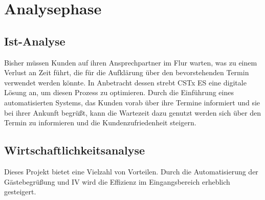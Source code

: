 \section{Analysephase} 
\label{sec:Analysephase}


\subsection{Ist-Analyse} 
\label{sec:IstAnalyse}
Bisher müssen Kunden auf ihren Ansprechpartner im Flur warten, was zu einem Verlust an Zeit führt, die für die Aufklärung über den bevorstehenden Termin verwendet werden könnte.
In Anbetracht dessen strebt \ac{CSTx ES} eine digitale Lösung an, um diesen Prozess zu optimieren.
Durch die Einführung eines automatisierten Systems, das Kunden vorab über ihre Termine informiert und sie bei ihrer Ankunft begrüßt, kann die Wartezeit dazu genutzt werden sich über den Termin zu informieren und die Kundenzufriedenheit steigern.

\subsection{Wirtschaftlichkeitsanalyse}
\label{sec:Wirtschaftlichkeitsanalyse}
Dieses Projekt bietet eine Vielzahl von Vorteilen.
Durch die Automatisierung der Gästebegrüßung und \ac{IV} wird die Effizienz im Eingangsbereich erheblich gesteigert.

